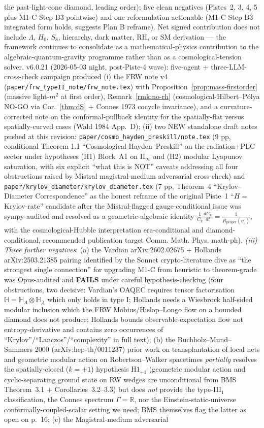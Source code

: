 \documentclass[reprint,amsmath,amssymb,aps,prd,superscriptaddress]{revtex4-2}
\providecommand{\HH}{\mathbb{H}}
\providecommand{\R}{\mathbb{R}}
\providecommand{\1}{\mathbf{1}}
\begin{document}
the past-light-cone diamond, leading order); five clean negatives (Pistes~2, 3, 4, 5 plus M1-C Step B3 pointwise) and one reformulation actionable (M1-C Step B3 integrated form holds, suggests Plan B reframe). Net signed contribution does not include $\Lambda$, $H_0$, $S_8$, hierarchy, dark matter, RH, or SM derivation — the framework continues to consolidate as a mathematical-physics contribution to the algebraic-quantum-gravity programme rather than as a cosmological-tension solver. v6.0.21 (2026-05-03 night, post-Piste-4 wave): five-agent + three-LLM-cross-check campaign produced (i) the FRW note v4 (\texttt{paper/frw\_typeII\_note/frw\_note.tex}) with Proposition~\ref{prop:mass-firstorder} (massive light-$m^2$ at first order), Remark~\ref{rmk:no-rh} (cosmological-Hilbert--P\'olya NO-GO via Cor.~\ref{thm:dS} + Connes 1973 cocycle invariance), and a curvature-corrected note on the conformal-pullback identity for the spatially-flat versus spatially-curved cases (Wald 1984 App.~D); (ii) two NEW standalone draft notes pushed at this revision: \texttt{paper/cosmo\_hayden\_preskill/note.tex} (9 pp, conditional Theorem 1.1 ``Cosmological Hayden--Preskill'' on the radiation+PLC sector under hypotheses (H1) Block~A1 on II$_\infty$ and (H2) modular Lyapunov saturation, with six explicit ``what this is NOT'' caveats addressing all four obstructions raised by Mistral magistral-medium adversarial cross-check) and \texttt{paper/krylov\_diameter/krylov\_diameter.tex} (7 pp, Theorem~4 ``Krylov--Diameter Correspondence'' as the honest reframe of the original Piste~1 ``$H = $Krylov-rate'' candidate after the Mistral-flagged gauge-conditional issue was sympy-audited and resolved as a geometric-algebraic identity $\frac{1}{C_k}\frac{dC_k}{dt} = \frac{1}{R_\mathrm{proper}(\eta_c)}$, with the cosmological-Hubble interpretation era-conditional and diamond-conditional, recommended publication target Comm. Math. Phys. math-ph). \emph{(iii) Three further negatives}: (a) the Vardian arXiv:2602.02675 + Hollands arXiv:2503.21385 pairing identified by the Sonnet crypto-literature dive as ``the strongest single connection'' for upgrading M1-C from heuristic to theorem-grade was Opus-audited and \textbf{FAILS} under careful hypothesis-checking (four obstructions, two decisive: Vardian's OAQEC requires tensor factorisation $\HH = \HH_A\otimes\HH_{\bar A}$ which only holds in type I; Hollands needs a Wiesbrock half-sided modular inclusion which the FRW M\"obius/Hislop--Longo flow on a bounded diamond does not produce; Hollands bounds observable-expectation flow not entropy-derivative and contains zero occurrences of ``Krylov''/``Lanczos''/``complexity'' in full text); (b) the Buchholz--Mund--Summers 2000 (arXiv:hep-th/0011237) prior work on transplantation of local nets and geometric modular action on Robertson--Walker spacetimes \emph{partially} resolves the spatially-closed ($k=+1$) hypothesis $\mathrm{H1}_{+1}$ (geometric modular action and cyclic-separating ground state on RW wedges are unconditional from BMS Theorem~3.1 + Corollaries~3.2--3.3) but does \emph{not} provide the type-III$_1$ classification, the Connes spectrum $\Gamma=\R$, nor the Einstein-static-universe conformally-coupled-scalar setting we need; BMS themselves flag the latter as open on p.~16; (c) the Magistral-medium adversarial 
\end{document}
